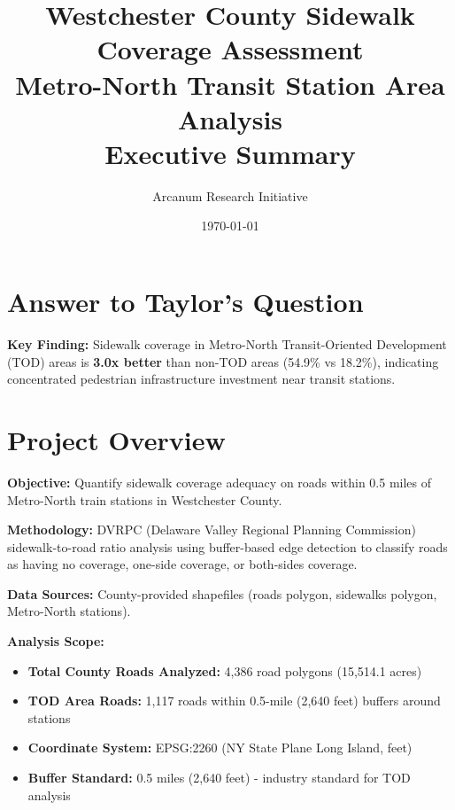 \documentclass[11pt,letterpaper]{article}
\title{\textbf{Westchester County Sidewalk Coverage Assessment}\\
\large Metro-North Transit Station Area Analysis\\
Executive Summary}
\author{Arcanum Research Initiative}
\date{\today}
\begin{document}
\maketitle

\section*{Answer to Taylor's Question}

\begin{center}
\end{center}

\vspace{0.5em}

\textbf{Key Finding:} Sidewalk coverage in Metro-North Transit-Oriented Development (TOD) areas is \textbf{3.0x better} than non-TOD areas (54.9\% vs 18.2\%), indicating concentrated pedestrian infrastructure investment near transit stations.

\section{Project Overview}

\textbf{Objective:} Quantify sidewalk coverage adequacy on roads within 0.5 miles of Metro-North train stations in Westchester County.

\textbf{Methodology:} DVRPC (Delaware Valley Regional Planning Commission) sidewalk-to-road ratio analysis using buffer-based edge detection to classify roads as having no coverage, one-side coverage, or both-sides coverage.

\textbf{Data Sources:} County-provided shapefiles (roads polygon, sidewalks polygon, Metro-North stations).

\textbf{Analysis Scope:}
\begin{itemize}
    \item \textbf{Total County Roads Analyzed:} 4,386 road polygons (15,514.1 acres)
    \item \textbf{TOD Area Roads:} 1,117 roads within 0.5-mile (2,640 feet) buffers around stations
    \item \textbf{Coordinate System:} EPSG:2260 (NY State Plane Long Island, feet)
    \item \textbf{Buffer Standard:} 0.5 miles (2,640 feet) - industry standard for TOD analysis
\end{itemize}
\end{document}
